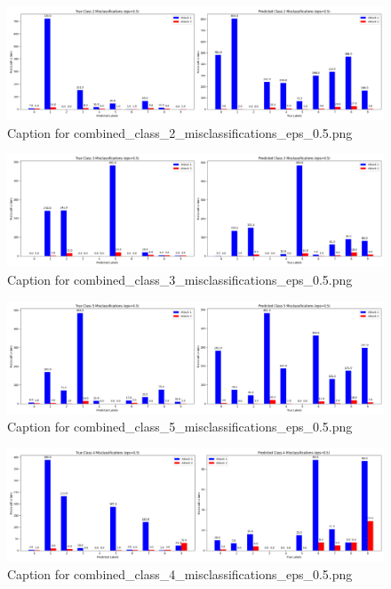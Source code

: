 \documentclass[11pt,onside]{article}
\begin{document}
\begin{figure}[ht]
\centering
\includegraphics[width=1\textwidth]{combined_class_boundary_pgd/combined_class_2_misclassifications_eps_0.5.png}
\caption{Caption for combined_class_2_misclassifications_eps_0.5.png}
\label{fig:combined_class_2_misclassifications_eps_0.5.png}
\end{figure}

\begin{figure}[ht]
\centering
\includegraphics[width=1\textwidth]{combined_class_boundary_pgd/combined_class_3_misclassifications_eps_0.5.png}
\caption{Caption for combined_class_3_misclassifications_eps_0.5.png}
\label{fig:combined_class_3_misclassifications_eps_0.5.png}
\end{figure}

\begin{figure}[ht]
\centering
\includegraphics[width=1\textwidth]{combined_class_boundary_pgd/combined_class_5_misclassifications_eps_0.5.png}
\caption{Caption for combined_class_5_misclassifications_eps_0.5.png}
\label{fig:combined_class_5_misclassifications_eps_0.5.png}
\end{figure}

\begin{figure}[ht]
\centering
\includegraphics[width=1\textwidth]{combined_class_boundary_pgd/combined_class_4_misclassifications_eps_0.5.png}
\caption{Caption for combined_class_4_misclassifications_eps_0.5.png}
\label{fig:combined_class_4_misclassifications_eps_0.5.png}
\end{figure}
\end{document}
